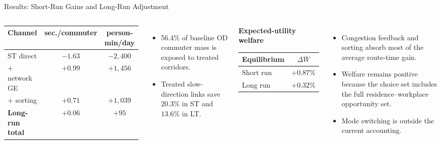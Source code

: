 \documentclass[11pt,aspectratio=169]{beamer}
\newcommand{\good}[1]{\textcolor{blue!70!black}{#1}}
\newcommand{\bad}[1]{\textcolor{red!70!black}{#1}}
\begin{document}
\begin{frame}[label=result2]{Results: Short-Run Gains and Long-Run Adjustment}
\begin{columns}[T,onlytextwidth]
\centering\scriptsize
\setlength{\tabcolsep}{4pt}
\begin{tabular}{lcc}
\toprule
Channel & sec./commuter & person-min/day \\
\midrule
ST direct & \good{$-1.63$} & \good{$-2{,}400$} \\
$+$ network GE & $+0.99$ & $+1{,}456$ \\
$+$ sorting & \bad{$+0.71$} & \bad{$+1{,}039$} \\
\midrule
\textbf{Long-run total} & \textbf{$+0.06$} & \textbf{$+95$} \\
\bottomrule
\end{tabular}
\vspace{0.55em}
\begin{itemize}\footnotesize
  \item \good{56.4\%} of baseline OD commuter mass is exposed to treated corridors.
  \item Treated slow-direction links save \good{$20.3\%$} in ST and \good{$13.6\%$} in LT.
\end{itemize}
\begin{center}
\small\textbf{Expected-utility welfare}\par
\vspace{0.5em}
\begin{tabular}{lc}
\toprule
Equilibrium & $\Delta\bar W$ \\
\midrule
Short run & \good{$+0.87\%$} \\
Long run & \good{$+0.32\%$} \\
\bottomrule
\end{tabular}
\end{center}
\vspace{0.65em}
\begin{itemize}\footnotesize
  \item Congestion feedback and sorting absorb most of the average route-time gain.
  \item Welfare remains positive because the choice set includes the full residence--workplace opportunity set.
  \item Mode switching is outside the current accounting.
\end{itemize}
\end{columns}
\end{frame}
\end{document}
